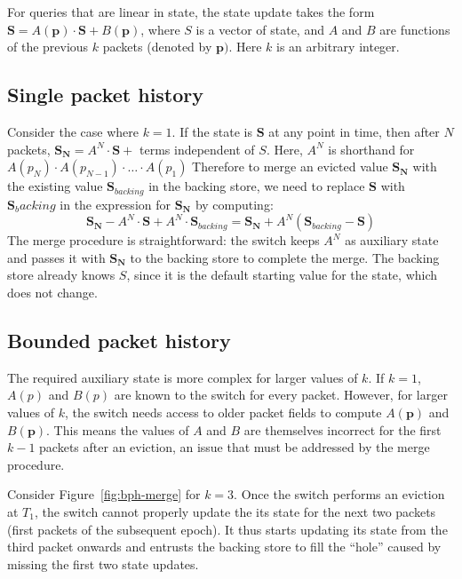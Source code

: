 For queries that are linear in state, the state update takes the form $\mathbf{S} = A(\mathbf{p})\cdot\mathbf{S} + B(\mathbf{p})$, where $S$ is a vector of state, and $A$ and $B$ are functions of the previous $k$ packets (denoted by $\mathbf{p})$. Here $k$ is an arbitrary integer.

\subsection{Single packet history}

Consider the case where $k = 1$. If the state is $\mathbf{S}$ at any point in time, then after $N$ packets,
$\mathbf{S_N} = A^N\cdot \mathbf{S} + $ terms independent of $S$. Here, $A^N$ is shorthand for $A(p_N)\cdot A(p_{N-1}) \cdot \ldots \cdot A(p_1)$
Therefore to merge an evicted value $\mathbf{S_N}$ with the existing value $\mathbf{S}_{backing}$ in the backing store,
we need to replace $\mathbf{S}$ with $\mathbf{S}_backing$ in the expression for $\mathbf{S_N}$ by computing:
\[ \mathbf{S_N} - A^N \cdot \mathbf{S} + A^N \cdot \mathbf{S}_{backing} = \mathbf{S_N} + A^N(\mathbf{S}_{backing} - \mathbf{S}) \]
The merge procedure is straightforward: the switch keeps $A^N$ as auxiliary state and passes it with $\mathbf{S_N}$ to the backing store to complete the merge.
The backing store already knows $S$, since it is the default starting value for the state, which does not change.

\subsection{Bounded packet history}

The required auxiliary state is more complex for larger values of $k$. If $k = 1$, $A(p)$ and $B(p)$ are known to the switch for every packet. However, for larger values of $k$, the switch needs access to older packet fields to compute $A(\mathbf{p})$ and $B(\mathbf{p})$. This means the values of $A$ and $B$ are themselves incorrect for the first $k-1$ packets after an eviction, an issue that must be addressed by the merge procedure.

Consider Figure~\ref{fig:bph-merge} for $k = 3$. Once the switch performs an eviction at $T_1$,
the switch cannot properly update the its state for the next two packets (first packets of the subsequent epoch).
It thus starts updating its state from the third packet onwards and entrusts the backing store to
fill the ``hole'' caused by missing the first two state updates.

